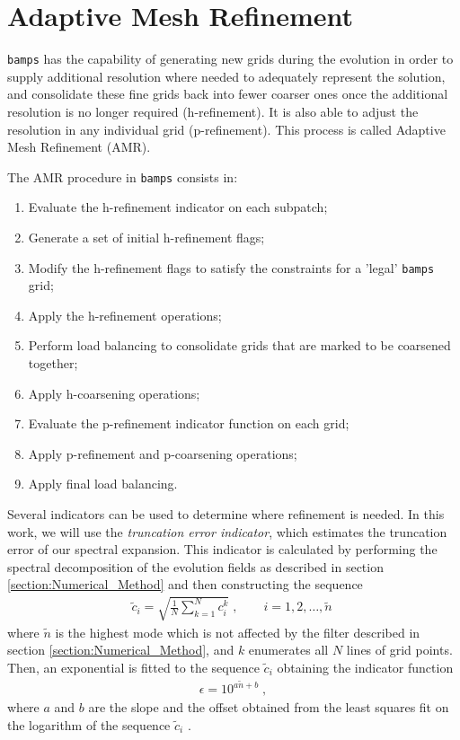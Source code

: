 \section{Adaptive Mesh Refinement}
\label{section:amr}

\texttt{bamps} has the capability of generating new grids during the evolution in order to supply additional resolution where needed to adequately represent the solution, and consolidate these fine grids back into fewer coarser ones once the additional resolution is no longer required (h-refinement). It is also able to adjust the resolution in any individual grid (p-refinement). This process is called Adaptive Mesh Refinement (AMR).

The AMR procedure in \texttt{bamps} consists in:
%
\begin{enumerate}
    \item Evaluate the h-refinement indicator on each subpatch;
    \item Generate a set of initial h-refinement flags;
    \item Modify the h-refinement flags to satisfy the constraints for a 'legal' \texttt{bamps} grid;
    \item Apply the h-refinement operations;
    \item  Perform load balancing to consolidate grids that are marked to be coarsened together;
    \item Apply h-coarsening operations;
    \item Evaluate the p-refinement indicator function on each grid;
    \item Apply p-refinement and p-coarsening operations;
    \item Apply final load balancing.
\end{enumerate}

Several indicators can be used to determine where refinement is needed. In this work, we will use the \textit{truncation error indicator}, which estimates the truncation error of our spectral expansion. This indicator is calculated by performing the spectral decomposition of the evolution fields as described in section \ref{section:Numerical_Method} and then constructing the sequence
%
\begin{align}
    \tilde{c}_i = \sqrt{\frac{1}{N} \sum_{k=1}^N c_i^k} \; , \quad \quad i = 1, 2, \ldots, \tilde{n} \;
\end{align}
%
where $\tilde{n}$ is the highest mode which is not affected by the filter described in section \ref{section:Numerical_Method}, and $k$ enumerates all $N$ lines of grid points. Then, an exponential is fitted to the sequence $\tilde{c}_i$ obtaining the indicator function
%
\begin{align}
    \epsilon = 10^{a \tilde{n} + b} \; ,
\end{align}
%
where $a$ and $b$ are the slope and the offset obtained from the least squares fit on the logarithm of the sequence $\tilde{c}_i$ \cite{Adaptive_hp_refinement_for_spectral_elements_in_numerical_relativity}.

